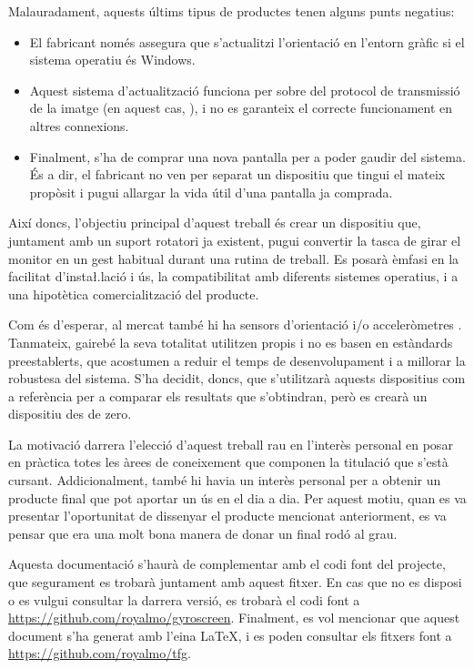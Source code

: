 Malauradament, aquests últims tipus de productes tenen alguns punts negatius:
\begin{itemize}
    \item El fabricant només assegura que s'actualitzi l'orientació en l'entorn
    gràfic si el sistema operatiu és Windows.
    \item Aquest sistema d'actualització funciona per sobre del protocol de
    transmissió de la imatge (en aquest cas, ), i no es garanteix el
    correcte funcionament en altres connexions.
    \item Finalment, s'ha de comprar una nova pantalla per a poder gaudir del
    sistema. És a dir, el fabricant no ven per separat un dispositiu que tingui
    el mateix propòsit i pugui allargar la vida útil d'una pantalla ja comprada.
\end{itemize}

Així doncs, l'objectiu principal d'aquest treball és crear un dispositiu que,
juntament amb un suport rotatori ja existent, pugui convertir la tasca de girar
el monitor en un gest habitual durant una rutina de treball. Es posarà èmfasi en
la facilitat d'insta\l.lació i ús, la compatibilitat amb diferents sistemes
operatius, i a una hipotètica comercialització del producte.

Com és d'esperar, al mercat també hi ha sensors d'orientació i/o acceleròmetres
 \cite{Yocto3D}. Tanmateix, gairebé la seva totalitat utilitzen
 propis i no es basen en estàndards preestablerts, que acostumen
a reduir el temps de desenvolupament i a millorar la robustesa del sistema. S'ha
decidit, doncs, que s'utilitzarà aquests dispositius com a referència per a
comparar els resultats que s'obtindran, però es crearà un dispositiu des de zero.

La motivació darrera l'elecció d'aquest treball rau en l'interès personal en
posar en pràctica totes les àrees de coneixement que componen la titulació que
s'està cursant. Addicionalment, també hi havia un interès personal per a obtenir
un producte final que pot aportar un ús en el dia a dia. Per aquest motiu, quan
es va presentar l'oportunitat de dissenyar el producte mencionat anteriorment,
es va pensar que era una molt bona manera de donar un final rodó al grau.

Aquesta documentació s'haurà de complementar amb el codi font del projecte, que
segurament es trobarà juntament amb aquest fitxer. En cas que no es disposi o
es vulgui consultar la darrera versió, es trobarà el codi font a
\url{https://github.com/royalmo/gyroscreen}.
Finalment, es vol mencionar que aquest document s'ha generat amb l'eina \LaTeX,
i es poden consultar els fitxers font a \url{https://github.com/royalmo/tfg}.
